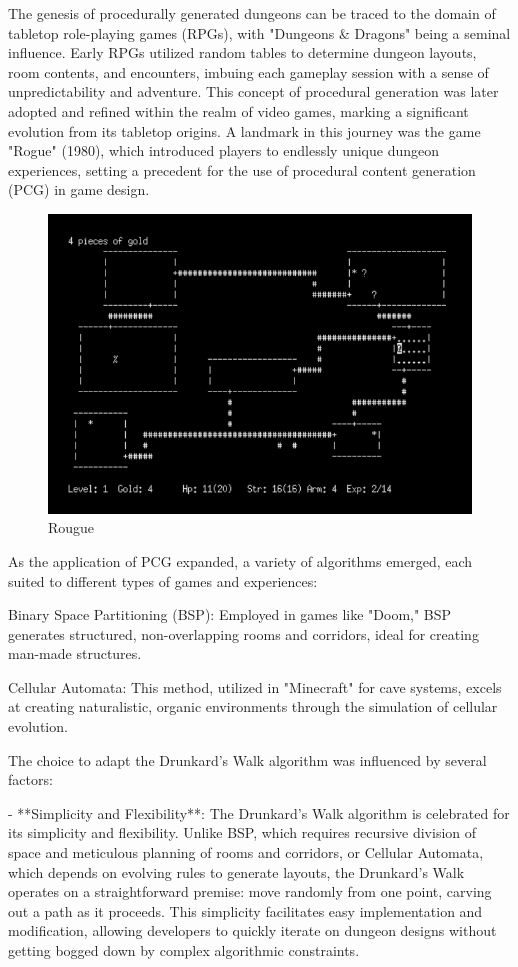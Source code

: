 \documentclass[10pt,twocolumn]{article}
\begin{document}
The genesis of procedurally generated dungeons can be traced to the domain of tabletop role-playing games (RPGs), with "Dungeons & Dragons" being a seminal influence. Early RPGs utilized random tables to determine dungeon layouts, room contents, and encounters, imbuing each gameplay session with a sense of unpredictability and adventure. This concept of procedural generation was later adopted and refined within the realm of video games, marking a significant evolution from its tabletop origins. A landmark in this journey was the game "Rogue" (1980), which introduced players to endlessly unique dungeon experiences, setting a precedent for the use of procedural content generation (PCG) in game design.\cite{Holmes2020Rogue}
\begin{figure}
    \centering
    \includegraphics[width=0.5\linewidth]{rougue.PNG}
    \caption{Rougue}
    \label{fig:enter-label}
\end{figure}

As the application of PCG expanded, a variety of algorithms emerged, each suited to different types of games and experiences:

Binary Space Partitioning (BSP): Employed in games like "Doom," BSP generates structured, non-overlapping rooms and corridors, ideal for creating man-made structures.\cite{TwoBitHistory2019DoomBSP}

Cellular Automata: This method, utilized in "Minecraft" for cave systems, excels at creating naturalistic, organic environments through the simulation of cellular evolution.\cite{HeardProceduralDungeonCA}

The choice to adapt the Drunkard’s Walk algorithm was influenced by several factors:

- **Simplicity and Flexibility**: The Drunkard's Walk algorithm is celebrated for its simplicity and flexibility. Unlike BSP, which requires recursive division of space and meticulous planning of rooms and corridors, or Cellular Automata, which depends on evolving rules to generate layouts, the Drunkard's Walk operates on a straightforward premise: move randomly from one point, carving out a path as it proceeds. This simplicity facilitates easy implementation and modification, allowing developers to quickly iterate on dungeon designs without getting bogged down by complex algorithmic constraints.
\end{document}
